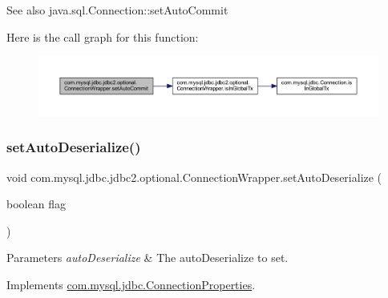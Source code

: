 \begin{DoxySeeAlso}{See also}
java.\+sql.\+Connection\+::set\+Auto\+Commit 
\end{DoxySeeAlso}
Here is the call graph for this function\+:
\nopagebreak
\begin{figure}[H]
\begin{center}
\leavevmode
\includegraphics[width=350pt]{classcom_1_1mysql_1_1jdbc_1_1jdbc2_1_1optional_1_1_connection_wrapper_ac27aa87d5bd9512af3870bd2a55af58d_cgraph}
\end{center}
\end{figure}
\mbox{\label{classcom_1_1mysql_1_1jdbc_1_1jdbc2_1_1optional_1_1_connection_wrapper_a4726b80bc80ed09e01a1e2be6e6fee84}} 
\subsubsection{\texorpdfstring{set\+Auto\+Deserialize()}{setAutoDeserialize()}}
{\footnotesize\ttfamily void com.\+mysql.\+jdbc.\+jdbc2.\+optional.\+Connection\+Wrapper.\+set\+Auto\+Deserialize (\begin{DoxyParamCaption}\item[{boolean}]{flag }\end{DoxyParamCaption})}


\begin{DoxyParams}{Parameters}
{\em auto\+Deserialize} & The auto\+Deserialize to set. \\
\hline
\end{DoxyParams}


Implements \mbox{\hyperlink{interfacecom_1_1mysql_1_1jdbc_1_1_connection_properties_ac22dc46adecba26efb43a6fdc239e292}{com.\+mysql.\+jdbc.\+Connection\+Properties}}.

